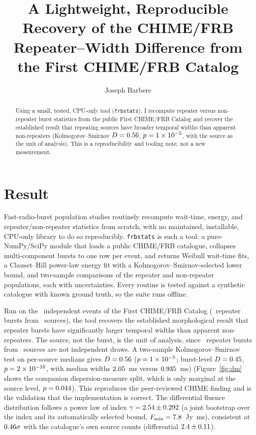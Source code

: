 \documentclass[RNAAS]{aastex631}
\newcommand{\code}[1]{\texttt{#1}}
\begin{document}
\title{A Lightweight, Reproducible Recovery of the CHIME/FRB Repeater--Width
Difference from the First CHIME/FRB Catalog}

\author[0009-0008-3289-4447]{Joseph Barbere}

\begin{abstract}
Using a small, tested, CPU-only tool (\code{frbstats}), I recompute repeater versus
non-repeater burst statistics from the public First CHIME/FRB Catalog and recover the
established result that repeating sources have broader temporal widths than apparent
non-repeaters (Kolmogorov--Smirnov $D=0.56$, $p=1\times10^{-5}$, with the source as
the unit of analysis). This is a
reproducibility and tooling note, not a new measurement.
\end{abstract}

\section{Result}

Fast-radio-burst population studies routinely recompute wait-time, energy, and
repeater/non-repeater statistics from scratch, with no maintained, installable,
CPU-only library to do so reproducibly. \code{frbstats} \citep{janskyresearch} is such a tool:
a pure-NumPy/SciPy module that loads a public CHIME/FRB catalogue, collapses
multi-component bursts to one row per event, and returns Weibull wait-time fits, a
Clauset--Hill power-law energy fit with a Kolmogorov--Smirnov-selected lower bound,
and two-sample comparisons of the repeater and non-repeater populations, each with
uncertainties. Every routine is tested against a synthetic catalogue with known
ground truth, so the suite runs offline.

Run on the \nBursts\ independent events of the First CHIME/FRB Catalog
\citep{chimecat1} (\nRepeaterBursts\ repeater bursts from \nRepeaterSources\ sources),
the tool recovers the established morphological result that repeater bursts have
significantly larger temporal widths than apparent non-repeaters. The source, not the
burst, is the unit of analysis, since \nRepeaterBursts\ repeater bursts from
\nRepeaterSources\ sources are not independent draws. A two-sample Kolmogorov--Smirnov
test on per-source medians gives $D=0.56$ ($p=1\times10^{-5}$;
burst-level $D=0.45$, $p=2\times10^{-10}$, with median widths $2.05$~ms versus
$0.935$~ms) (Figure~\ref{fig:dm} shows the companion dispersion-measure split,
which is only marginal at the source level, $p=0.044$). This reproduces the
peer-reviewed CHIME finding and is the validation that the implementation is correct. The
differential fluence distribution follows a power law of index
$\gamma=2.54\pm0.292$ (a joint bootstrap over the index and its
automatically selected bound, $F_\mathrm{min}=7.8$~Jy~ms), consistent at
$0.46\sigma$ with the catalogue's own source counts (differential
$2.4\pm0.11$).
\end{document}

